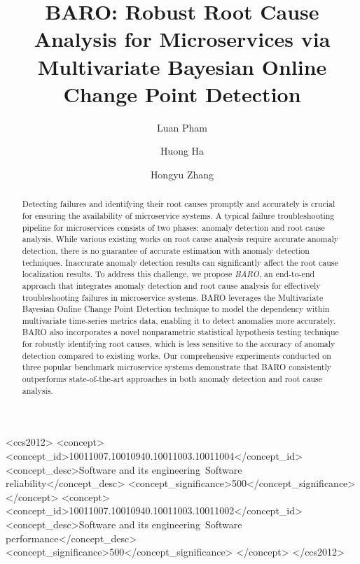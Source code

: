 \documentclass[acmsmall]{acmart}
\begin{document}
\title{BARO: Robust Root Cause Analysis for Microservices via Multivariate Bayesian Online Change Point Detection}

\author{Luan Pham}

\author{Huong Ha}

\author{Hongyu Zhang}





\begin{abstract}

Detecting failures and identifying their root causes promptly and accurately is crucial for ensuring the availability of microservice systems. A typical failure troubleshooting pipeline for microservices consists of two phases: anomaly detection and root cause analysis. While various existing works on root cause analysis require accurate anomaly detection, there is no guarantee of accurate estimation with anomaly detection techniques. Inaccurate anomaly detection results can significantly affect the root cause localization results. To address this challenge, we propose \textit{BARO}, an end-to-end approach that integrates anomaly detection and root cause analysis for effectively troubleshooting failures in microservice systems. BARO leverages the Multivariate Bayesian Online Change Point Detection technique to model the dependency within multivariate time-series metrics data, enabling it to detect anomalies more accurately. BARO also incorporates a novel nonparametric statistical hypothesis testing technique for robustly identifying root causes, which is less sensitive to the accuracy of anomaly detection compared to existing works. Our comprehensive experiments conducted on three popular benchmark microservice systems demonstrate that BARO consistently outperforms state-of-the-art approaches in both anomaly detection and root cause analysis.



\end{abstract}


\begin{CCSXML}
<ccs2012>
   <concept>
       <concept_id>10011007.10010940.10011003.10011004</concept_id>
       <concept_desc>Software and its engineering~Software reliability</concept_desc>
       <concept_significance>500</concept_significance>
       </concept>
   <concept>
       <concept_id>10011007.10010940.10011003.10011002</concept_id>
       <concept_desc>Software and its engineering~Software performance</concept_desc>
       <concept_significance>500</concept_significance>
       </concept>
 </ccs2012>
\end{CCSXML}
\end{document}
